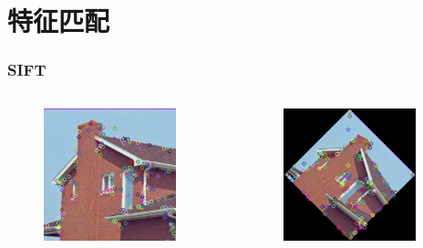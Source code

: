 \documentclass[presentation,aspectratio=1610]{beamer}
\begin{document}
\section[特征匹配]{特征匹配}
\begin{frame}
	\frametitle{SIFT}
	\begin{columns}
		\begin{figure}[htbp!]
			\centering
			\includegraphics[width=0.9\textwidth]{sift/img_1_feature.png}
		\end{figure}
					
	\begin{figure}[htbp!]
		\centering
		\includegraphics[width=0.9\textwidth]{sift/img_2_feature.png}
	\end{figure}	
		

\end{columns}
\end{frame}
\end{document}
